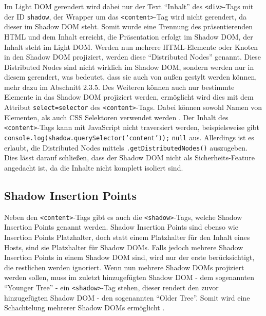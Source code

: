 Im Light DOM gerendert wird dabei nur der Text ``Inhalt'' des \texttt{\textless{}div\textgreater{}}-Tags mit der ID \texttt{shadow}, der Wrapper um das \texttt{\textless{}content\textgreater{}}-Tag wird nicht gerendert, da dieser im Shadow DOM steht. Somit wurde eine Trennung des präsentierenden HTML und dem Inhalt erreicht, die Präsentation erfolgt im Shadow DOM, der Inhalt steht im Light DOM. Werden nun mehrere HTML-Elemente oder Knoten in den Shadow DOM projiziert, werden diese ``Distributed Nodes'' genannt. Diese Distributed Nodes sind nicht wirklich im Shadow DOM, sondern werden nur in diesem gerendert, was bedeutet, dass sie auch von außen gestylt werden können, mehr dazu im Abschnitt 2.3.5. Des Weiteren können auch nur bestimmte Elemente in das Shadow DOM projiziert werden, ermöglicht wird dies mit dem Attribut \texttt{select=\dq selector\dq} des \texttt{\textless{}content\textgreater{}}-Tags. Dabei können sowohl Namen von Elementen, als auch CSS Selektoren verwendet werden \cite{citeulike:13851402}. Der Inhalt des \texttt{\textless{}content\textgreater{}}-Tags kann mit JavaScript nicht traversiert werden, beispielsweise gibt \texttt{console.log(shadow.querySelector('content'));} \texttt{null} aus. Allerdings ist es erlaubt, die Distributed Nodes mittels \texttt{.getDistributedNodes()} auszugeben. Dies lässt darauf schließen, dass der Shadow DOM nicht als Sicherheits-Feature angedacht ist, da die Inhalte nicht komplett isoliert sind.

\subsection{Shadow Insertion Points}\label{shadow-insertion-points}

Neben den \texttt{\textless{}content\textgreater{}}-Tags gibt es auch die \texttt{\textless{}shadow\textgreater{}}-Tags, welche Shadow Insertion Points genannt werden. Shadow Insertion Points sind ebenso wie Insertion Points Platzhalter, doch statt einem Platzhalter für den Inhalt eines Hosts, sind sie Platzhalter für Shadow DOMs. Falls jedoch mehrere Shadow Insertion Points in einem Shadow DOM sind, wird nur der erste berücksichtigt, die restlichen werden ignoriert. Wenn nun mehrere Shadow DOMs projiziert werden sollen, muss im zuletzt hinzugefügten Shadow DOM - dem sogenannten ``Younger Tree'' - ein \texttt{\textless{}shadow\textgreater{}}-Tag stehen, dieser rendert den zuvor hinzugefügten Shadow DOM - den sogenannten ``Older Tree''. Somit wird eine Schachtelung mehrerer Shadow DOMs ermöglicht \cite{citeulike:13851421}.

